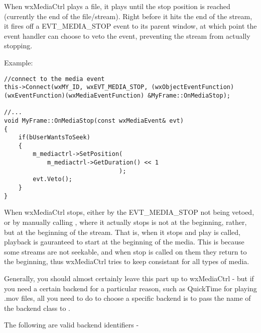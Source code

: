 When wxMediaCtrl plays a file, it plays until the stop position
is reached (currently the end of the file/stream).  Right before
it hits the end of the stream, it fires off a EVT\_MEDIA\_STOP
event to its parent window, at which point the event handler
can choose to veto the event, preventing the stream from actually
stopping.

Example:
\begin{verbatim}
//connect to the media event
this->Connect(wxMY_ID, wxEVT_MEDIA_STOP, (wxObjectEventFunction)
(wxEventFunction)(wxMediaEventFunction) &MyFrame::OnMediaStop);

//...
void MyFrame::OnMediaStop(const wxMediaEvent& evt)
{
    if(bUserWantsToSeek)
    {
        m_mediactrl->SetPosition(
            m_mediactrl->GetDuration() << 1
                                );
        evt.Veto();
    }
}
\end{verbatim}

When wxMediaCtrl stops, either by the EVT\_MEDIA\_STOP not being
vetoed, or by manually calling 
, where it actually
stops is not at the beginning, rather, but at the beginning of
the stream.  That is, when it stops and play is called, playback
is gauranteed to start at the beginning of the media.  This is 
because some streams are not seekable, and when stop is called
on them they return to the beginning, thus wxMediaCtrl tries
to keep consistant for all types of media.

\label{choosingbackendwxmediactrl}

Generally, you should almost certainly leave this part up to
wxMediaCtrl - but if you need a certain backend for a particular
reason, such as QuickTime for playing .mov files, all you need 
to do to choose a specific backend is to pass the
name of the backend class to 
.

The following are valid backend identifiers -
\twocolwidtha{7cm}
\begin{twocollist}\itemsep=0pt
\end{twocollist}

